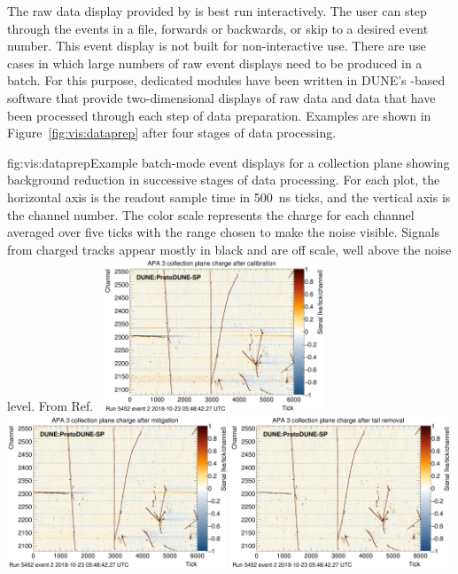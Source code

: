 \documentclass[../main-v1.tex]{subfiles}
\begin{document}
The raw data display provided by  is best run interactively.  The user can step through the events in a file, forwards or backwards, or skip to a desired event number.  This event display is not built for non-interactive use.  There are use cases in which large numbers of raw event displays need to be produced in a batch.  For this purpose, dedicated modules have been written in DUNE's -based software that provide two-dimensional displays of raw data and data that have been processed through each step of data preparation. Examples are shown in Figure~\ref{fig:vis:dataprep} after four stages of data processing.


\begin{dunefigure}{fig:vis:dataprep}{Example batch-mode event displays for a collection plane showing background reduction in successive stages of data processing.
For each plot, the horizontal axis is the readout sample time in 500~ns ticks, and the vertical axis is the channel number.
The color scale represents the charge for each channel averaged over five ticks
with the range chosen to make the noise visible.
Signals from charged tracks appear mostly in black and are off scale, well
above the noise level.  From Ref.~\cite{DUNE:2020cqd}}
\includegraphics[width=0.49\textwidth]{graphics/EventDisplays/adccal_tpp0z_run005452_evt000002.png}
\includegraphics[width=0.49\textwidth]{graphics/EventDisplays/adcmit_tpp0z_run005452_evt000002.png}
\includegraphics[width=0.49\textwidth]{graphics/EventDisplays/adctai_tpp0z_run005452_evt000002.png}

\end{dunefigure}
\end{document}
